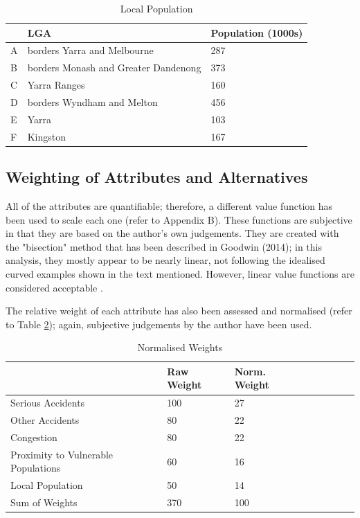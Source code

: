 \documentclass[11pt, a4paper]{article}
\begin{document}
    \begin{table}[!ht]
        \centering
        \begin{tabular}{|l|l|l|}
        \hline
            ~ & LGA & Population (1000s)  \\ \hline
            A & borders Yarra and Melbourne & 287  \\ \hline
            B & borders Monash and Greater Dandenong & 373  \\ \hline
            C & Yarra Ranges & 160  \\ \hline
            D & borders Wyndham and Melton & 456  \\ \hline
            E & Yarra & 103  \\ \hline
            F & Kingston & 167  \\ \hline
        \end{tabular}
        \caption{Local Population}
        \label{t8}
    \end{table}

    \subsection{Weighting of Attributes and Alternatives}

    All of the attributes are quantifiable; therefore, a different value function has been used to scale each one (refer to Appendix B). These functions are subjective in that they are based on the author's own judgements. They are created with the "bisection" method that has been described in Goodwin (2014); in this analysis, they mostly appear to be nearly linear, not following the idealised curved examples shown in the text mentioned. However, linear value functions are considered acceptable \parencite{a6}.

    The relative weight of each attribute has also been assessed and normalised (refer to Table \ref{t9}); again, subjective judgements by the author have been used.

    \begin{table}[!ht]
        \centering
        \begin{tabular}{|l|l|l|l|l|l|l|l|}
        \hline
            ~ & Raw Weight & Norm. Weight       \\ \hline
            Serious Accidents & 100 & 27       \\ \hline
            Other Accidents & 80 & 22       \\ \hline
            Congestion & 80 & 22       \\ \hline
            Proximity to Vulnerable Populations & 60 & 16       \\ \hline
            Local Population & 50 & 14       \\ \hline
            Sum of Weights & 370 & 100       \\ \hline
        \end{tabular}
        \caption{Normalised Weights}
        \label{t9}
    \end{table}
\end{document}
